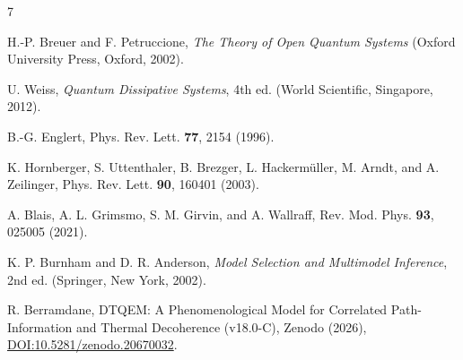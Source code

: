 \documentclass[aps,pra,reprint,amsmath,amssymb,superscriptaddress]{revtex4-2}
\begin{document}
\begin{thebibliography}{7}

H.-P. Breuer and F. Petruccione, \textit{The Theory of Open Quantum Systems} (Oxford University Press, Oxford, 2002).

U. Weiss, \textit{Quantum Dissipative Systems}, 4th ed. (World Scientific, Singapore, 2012).

B.-G. Englert, Phys. Rev. Lett. \textbf{77}, 2154 (1996).

K. Hornberger, S. Uttenthaler, B. Brezger, L. Hackerm\"uller, M. Arndt, and A. Zeilinger, Phys. Rev. Lett. \textbf{90}, 160401 (2003).

A. Blais, A. L. Grimsmo, S. M. Girvin, and A. Wallraff, Rev. Mod. Phys. \textbf{93}, 025005 (2021).

K. P. Burnham and D. R. Anderson, \textit{Model Selection and Multimodel Inference}, 2nd ed. (Springer, New York, 2002).

R. Berramdane, DTQEM: A Phenomenological Model for Correlated Path-Information and Thermal Decoherence (v18.0-C), Zenodo (2026), \href{https://doi.org/10.5281/zenodo.20670032}{DOI:10.5281/zenodo.20670032}.

\end{thebibliography}
\end{document}
